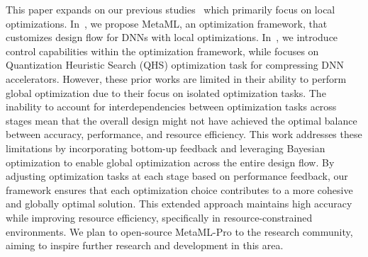 This paper expands on our previous studies~\cite{que2023metaml, que2024deep, que2024optimizing} which primarily focus on local optimizations. In~\cite{que2023metaml}, we propose MetaML, an optimization framework, that customizes design flow for DNNs with local optimizations. In~\cite{que2024deep}, we introduce control capabilities within the optimization framework, while \cite{que2023metaml} focuses on Quantization Heuristic Search (QHS) optimization task for compressing DNN accelerators. 
However, these prior works are limited in their ability to perform global optimization due to their focus on isolated optimization tasks. The inability to account for interdependencies between optimization tasks across stages mean that the overall design might not have achieved the optimal balance between accuracy, performance, and resource efficiency. This work addresses these limitations by incorporating bottom-up feedback and leveraging Bayesian optimization to enable global optimization across the entire design flow. By adjusting optimization tasks at each stage based on performance feedback, our framework ensures that each optimization choice contributes to a more cohesive and globally optimal solution. This extended approach maintains high accuracy while improving resource efficiency, specifically in resource-constrained environments. We plan to open-source MetaML-Pro to the research community, aiming to inspire further research and development in this area.

 

